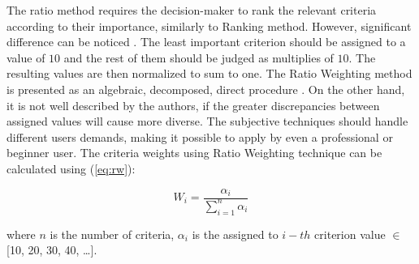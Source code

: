 The ratio method requires the decision-maker to rank the relevant criteria according to their importance, similarly to Ranking method. However, significant difference can be noticed \cite{odu2019weighting}. The least important criterion should be assigned to a value of $10$ and the rest of them should be judged as multiplies of $10$. The resulting values are then normalized to sum to one. The Ratio Weighting method is presented as an algebraic, decomposed, direct procedure \cite{zardari2015weighting}. On the other hand, it is not well described by the authors, if the greater discrepancies between assigned values will cause more diverse. The subjective techniques should handle different users demands, making it possible to apply by even a professional or beginner user. The criteria weights using Ratio Weighting technique can be calculated using (\ref{eq:rw}):

\begin{equation}
    W_i = \frac{\alpha_i}{\sum^{n}_{i=1} \alpha_i}
\label{eq:rw}
\end{equation}

where $n$ is the number of criteria, $\alpha_i$ is the assigned to $i-th$ criterion value $\in$ [10, 20, 30, 40, \ldots]. \\
